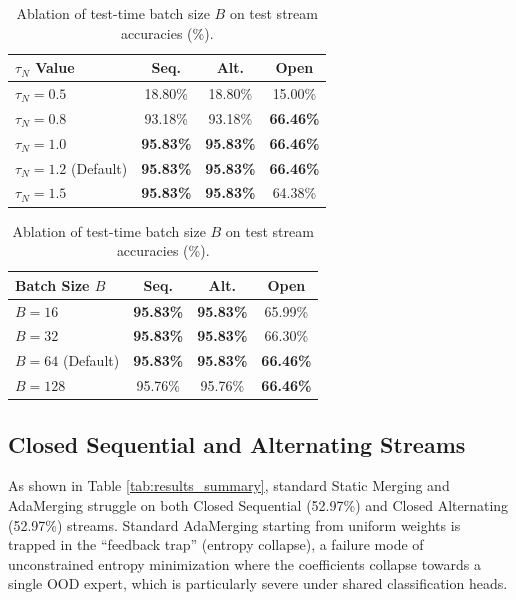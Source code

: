 \documentclass{article}
\theoremstyle{plain}
\theoremstyle{definition}
\theoremstyle{remark}
\begin{document}
\begin{table}[t]
\begin{minipage}{0.48\textwidth}
\centering
\caption{Ablation of novelty detection threshold $\tau_N$ on test stream accuracies (\%).}
\label{tab:ablation_taun}
\vskip 0.04in
\begin{footnotesize}
\begin{sc}
\renewcommand{\arraystretch}{0.88}
\begin{tabular}{lccc}
\toprule
$\tau_N$ Value & Seq. & Alt. & Open \\
\midrule
$\tau_N = 0.5$ & 18.80\% & 18.80\% & 15.00\% \\
$\tau_N = 0.8$ & 93.18\% & 93.18\% & \textbf{66.46\%} \\
$\tau_N = 1.0$ & \textbf{95.83\%} & \textbf{95.83\%} & \textbf{66.46\%} \\
$\tau_N = 1.2$ (Default) & \textbf{95.83\%} & \textbf{95.83\%} & \textbf{66.46\%} \\
$\tau_N = 1.5$ & \textbf{95.83\%} & \textbf{95.83\%} & 64.38\% \\
\bottomrule
\end{tabular}
\end{sc}
\end{footnotesize}
\end{minipage}
\hfill
\begin{minipage}{0.48\textwidth}
\centering
\caption{Ablation of test-time batch size $B$ on test stream accuracies (\%).}
\label{tab:ablation_batch}
\vskip 0.04in
\begin{footnotesize}
\begin{sc}
\renewcommand{\arraystretch}{0.88}
\begin{tabular}{lccc}
\toprule
Batch Size $B$ & Seq. & Alt. & Open \\
\midrule
$B = 16$ & \textbf{95.83\%} & \textbf{95.83\%} & 65.99\% \\
$B = 32$ & \textbf{95.83\%} & \textbf{95.83\%} & 66.30\% \\
$B = 64$ (Default) & \textbf{95.83\%} & \textbf{95.83\%} & \textbf{66.46\%} \\
$B = 128$ & 95.76\% & 95.76\% & \textbf{66.46\%} \\
\bottomrule
\end{tabular}
\end{sc}
\end{footnotesize}
\end{minipage}
\end{table}

\subsection{Closed Sequential and Alternating Streams}\vspace{-0.1in}
As shown in Table \ref{tab:results_summary}, standard Static Merging and AdaMerging struggle on
both Closed Sequential (52.97\%) and Closed Alternating (52.97\%) streams. Standard AdaMerging starting from uniform weights is trapped in the
``feedback trap'' (entropy collapse), a failure mode of unconstrained entropy minimization where the
coefficients collapse towards a single OOD expert, which is particularly severe under shared classification heads.
\end{document}
